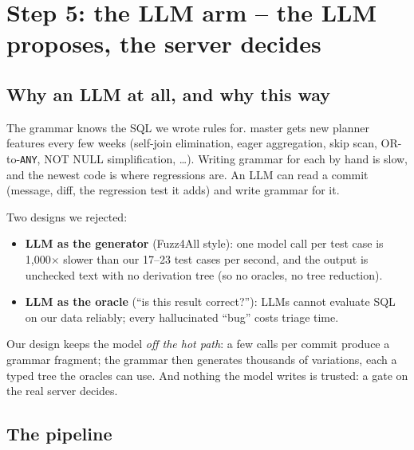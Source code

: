 \section{Step 5: the LLM arm -- the LLM proposes, the server decides}
\label{sec:llm}

\subsection{Why an LLM at all, and why this way}

The grammar knows the SQL we wrote rules for. \pg master gets new planner
features every few weeks (self-join elimination, eager aggregation, skip scan,
OR-to-\texttt{ANY}, NOT NULL simplification, \dots). Writing grammar for each by
hand is slow, and the newest code is where regressions are. An LLM can read a
commit (message, diff, the regression test it adds) and write grammar for it.

Two designs we rejected:
\begin{itemize}
  \item \textbf{LLM as the generator} (Fuzz4All style): one model call per
    test case is 1{,}000$\times$ slower than our 17--23 test cases per second,
    and the output is unchecked text with no derivation tree (so no oracles, no
    tree reduction).
  \item \textbf{LLM as the oracle} (``is this result correct?''): LLMs cannot
    evaluate SQL on our data reliably; every hallucinated ``bug'' costs triage
    time.
\end{itemize}
Our design keeps the model \emph{off the hot path}: a few calls per commit
produce a grammar fragment; the grammar then generates thousands of
variations, each a typed tree the oracles can use. And nothing the model writes
is trusted: a gate on the real server decides.

\subsection{The pipeline}

